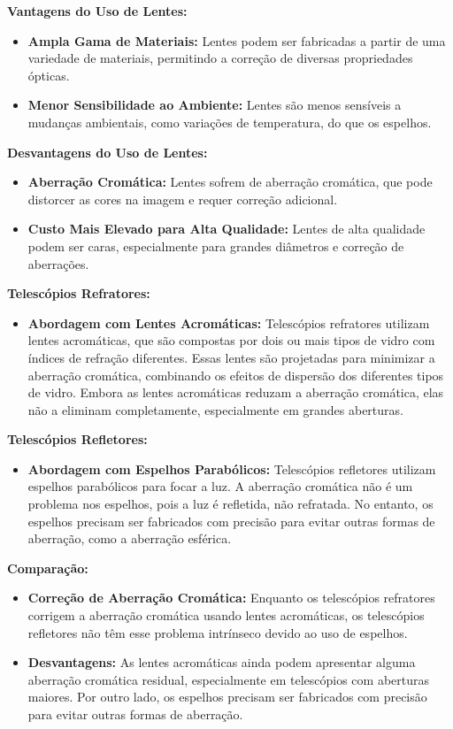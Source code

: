 \documentclass[a4paper, 12pt]{article}
\begin{document}
\textbf{Vantagens do Uso de Lentes:}
\begin{itemize}
    \item \textbf{Ampla Gama de Materiais:} Lentes podem ser fabricadas a partir de uma variedade de materiais, permitindo a correção de diversas propriedades ópticas.
    \item \textbf{Menor Sensibilidade ao Ambiente:} Lentes são menos sensíveis a mudanças ambientais, como variações de temperatura, do que os espelhos.
\end{itemize}

\textbf{Desvantagens do Uso de Lentes:}
\begin{itemize}
    \item \textbf{Aberração Cromática:} Lentes sofrem de aberração cromática, que pode distorcer as cores na imagem e requer correção adicional.
    \item \textbf{Custo Mais Elevado para Alta Qualidade:} Lentes de alta qualidade podem ser caras, especialmente para grandes diâmetros e correção de aberrações.
\end{itemize}

\textbf{Telescópios Refratores:}
\begin{itemize}
    \item \textbf{Abordagem com Lentes Acromáticas:} Telescópios refratores utilizam lentes acromáticas, que são compostas por dois ou mais tipos de vidro com índices de refração diferentes. Essas lentes são projetadas para minimizar a aberração cromática, combinando os efeitos de dispersão dos diferentes tipos de vidro. Embora as lentes acromáticas reduzam a aberração cromática, elas não a eliminam completamente, especialmente em grandes aberturas.
\end{itemize}

\textbf{Telescópios Refletores:}
\begin{itemize}
    \item \textbf{Abordagem com Espelhos Parabólicos:} Telescópios refletores utilizam espelhos parabólicos para focar a luz. A aberração cromática não é um problema nos espelhos, pois a luz é refletida, não refratada. No entanto, os espelhos precisam ser fabricados com precisão para evitar outras formas de aberração, como a aberração esférica.
\end{itemize}

\textbf{Comparação:}
\begin{itemize}
    \item \textbf{Correção de Aberração Cromática:} Enquanto os telescópios refratores corrigem a aberração cromática usando lentes acromáticas, os telescópios refletores não têm esse problema intrínseco devido ao uso de espelhos.
    \item \textbf{Desvantagens:} As lentes acromáticas ainda podem apresentar alguma aberração cromática residual, especialmente em telescópios com aberturas maiores. Por outro lado, os espelhos precisam ser fabricados com precisão para evitar outras formas de aberração.
\end{itemize}
\end{document}
